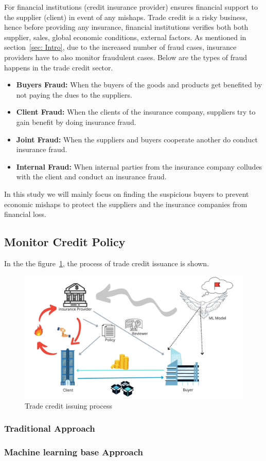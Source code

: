 For financial institutions (credit insurance provider) ensures financial support to the supplier (client) in event of any mishaps. Trade credit is a risky business, hence before providing any insurance, financial institutions verifies both both supplier, sales, global economic conditions, external factors. As mentioned in section~\ref{sec: Intro}, due to the increased number of fraud cases, insurance providers have to also monitor fraudulent cases. Below are the types of fraud happens in the trade credit sector.

\begin{itemize}
    \item \textbf{Buyers Fraud:} When the buyers of the goods and products get benefited by not paying the dues to the suppliers.
    \item \textbf{Client Fraud:} When the clients of the insurance company, suppliers try to gain benefit by doing insurance fraud.
    \item \textbf{Joint Fraud:} When the suppliers and buyers cooperate another do conduct insurance fraud.
    \item \textbf{Internal Fraud:} When internal parties from the insurance company colludes with the client and conduct an insurance fraud.
\end{itemize}

In this study we will mainly focus on finding the suspicious buyers to prevent economic mishaps to protect the suppliers and the insurance companies from financial loss.


\subsection{Monitor Credit Policy}\label{subsec:monitor-credit-policy}


In the the figure~\ref{fig:trade_credit}, the process of trade credit issuance is shown.

\begin{figure}[htp]
    \centering
    \includegraphics[width=\linewidth]{figures/monitor_buyers.jpg}
    \caption{Trade credit issuing process}
    \label{fig:trade_credit}
\end{figure}

\subsubsection{Traditional Approach}

\subsubsection{Machine learning base Approach}



